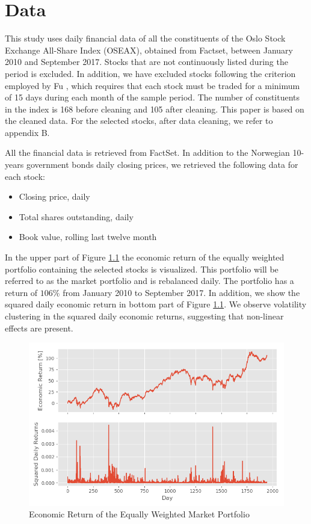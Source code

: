 \chapter{Data}
\label{Da}

This study uses daily financial data of all the constituents of the Oslo Stock Exchange All-Share Index (OSEAX), obtained from Factset, between January 2010 and September 2017. Stocks that are not continuously listed during the period is excluded. In addition, we have excluded stocks following the criterion employed by Fu \cite{Fu}, which requires that each stock must be traded for a minimum of 15 days during each month of the sample period. The number of constituents in the index is 168 before cleaning and 105 after cleaning. This paper is based on the cleaned data. For the selected stocks, after data cleaning, we refer to appendix B. 

All the financial data is retrieved from FactSet. In addition to the Norwegian 10-years government bonds daily closing prices, we retrieved the following data for each stock:
\begin{itemize}
    \item Closing price, daily
    \item Total shares outstanding, daily
    \item Book value, rolling last twelve month
\end{itemize}

In the upper part of Figure \ref{MarketReturn} the economic return of the equally weighted portfolio containing the selected stocks is visualized. This portfolio will be referred to as the market portfolio and is rebalanced daily. The portfolio has a return of $106\%$ from January 2010 to September 2017. In addition, we show the squared daily economic return in bottom part of Figure \ref{MarketReturn}. We observe volatility clustering in the squared daily economic returns, suggesting that non-linear effects are present.

\begin{figure}[h]
\label{MarketReturn}
    \centering
    \includegraphics[scale = 0.7]{Plot/MarketReturn.png}
    \caption{Economic Return of the Equally Weighted Market Portfolio}
    \label{MarketReturn}
\end{figure}


